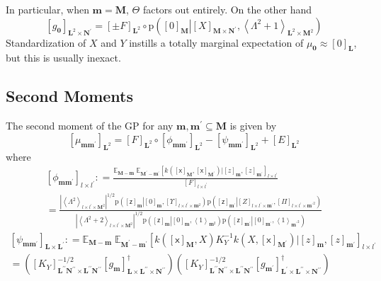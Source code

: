 \documentclass[preprint,12pt]{elsarticle}
\newcommand*{\M}[1]{\ensuremath{#1}\xspace}
\newcommand*{\x}{\times}
\newcommand*{\mi}[1]{\mathbf{#1}}
\newcommand*{\rv}[1]{\mathsf{#1}}
\newcommand*{\te}[2][]{\left\lbrack{#2}\right\rbrack_{#1}}
\newcommand*{\diag}[2][]{\left\langle{#2}\right\rangle_{#1}}
\newcommand*{\prob}[3]{\M{\mathrm{p}\!\left(\left.{#1}\right\vert{#2,#3}\right)}}
\newcommand*{\deq}{\M{\mathrel{\mathop:}=}}
\newcommand*{\evt}[3][]{\mathbb{E}_{#3}^{#1}\!#2}
\newcommand*{\modulus}[1]{\M{\left\lvert{#1}\right\rvert}}
\begin{document}
        In particular, when $\mi{m} = \mi{M}$, $\Theta$ factors out entirely. On the other hand
        \begin{equation*}
                \te[\mi{L}^{2}\x\mi{N^{\prime}}]{g_{\mi{0}}} =
                \te[\mi{L}^{2}]{\pm F} \circ 
                \prob{\te[\mi{M}]{0}}{\te[\mi{M}\x\mi{N^{\prime}}]{X}}
                {\diag[\mi{L}^{2}\x\mi{M}^{2}]{\Lambda^{2}+1}}                  
        \end{equation*}
        Standardization of $X$ and $Y$ instills a totally marginal expectation of $\mu_{\mi{0}} \approx \te[\mi{L}]{0}$, but this is usually inexact.

        \subsection{Second Moments} \label{sub:GPMom:Second}
        The second moment of the GP for any $\mi{m,m^{\prime}}\subseteq\mi{M}$ is given by
            \begin{equation} \label{eq:GPMom:Second}
                \te[\mi{L}^2]{\mu_{\mi{mm^{\prime}}}} = 
                \te[\mi{L}^2]{F} \circ \te[\mi{L}^2]{\phi_{\mi{mm^{\prime}}}} - \te[\mi{L}^2]{\psi_{\mi{mm^{\prime}}}} + \te[\mi{L}^2]{E}                        
            \end{equation}
            where
            \begin{multline*}
                \te[l\x l^{\prime}]{\phi_{\mi{mm^{\prime}}}}
                \deq \frac{\evt{\;\evt{\te[l\x l^{\prime}]{k\!\left(\te[\mi{M}]{\rv{x}},\te[\mi{M^{\prime}}]{\rv{x}}\right) \big\vert \te[\mi{m}]{z},\te[\mi{m^{\prime}}]{z}}}{\mi{M^{\prime}-m^{\prime}}}}{\mi{M-m}}}{\te[l\x l^{\prime}]{F}} \\
                = \frac
                {\modulus{\diag[l\x l^{\prime}\x\mi{M}^{2}]{\Lambda^{2}}}^{1/2} \prob{\te[\mi{m}]{\rv{z}}}{\te[\mi{m}]{0}}{\te[l\x l^{\prime}\x\mi{m}^2]{\Upsilon}}\prob{\te[\mi{m^{\prime}}]{\rv{z}}}{\te[l\x l^{\prime}\x \mi{m^{\prime}}]{Z}}{\te[l\x l^{\prime}\x\mi{m^{\prime}}^{2}]{\Pi}}}
                {\modulus{\diag[l\x l^{\prime}\x\mi{M}^2]{\Lambda^{2}+2}}^{1/2}
                \prob{\te[\mi{m}]{\rv{z}}}{\te[\mi{m}]{0}}{\diag[\mi{m}^{2}]{1}}\prob{\te[\mi{m^{\prime}}]{\rv{z}}}{\te[\mi{m^{\prime}}]{0}}{\diag[\mi{m^{\prime}}^{2}]{1}}}
            \end{multline*}
            \begin{multline*}
                \te[\mi{L\x L^{\prime}}]{\psi_{\mi{mm^{\prime}}}}
                \deq \evt{\;\evt{\te[l\x l^{\prime}]{k\!\left(\te[\mi{M}]{\rv{x}},X\right) K_{Y}^{-1} k\!\left(X,\te[\mi{M^{\prime}}]{\rv{x}}\right) \big\vert \te[\mi{m}]{z},\te[\mi{m^{\prime}}]{z}}}{\mi{M^{\prime}-m^{\prime}}}}{\mi{M-m}} \\
                 = \left(\te[\mi{L^{\prime\prime}N^{\prime\prime}}\x\mi{L^{\prime\prime}N^{\prime\prime}}]{K_{Y}}^{-1/2}
                 \te[\mi{L\x L^{\prime\prime}\x N^{\prime\prime}}]{g_{\mi{m}}}^{\dagger}\right)
                \left(\te[\mi{L^{\prime\prime}N^{\prime\prime}}\x\mi{L^{\prime\prime}N^{\prime\prime}}]{K_{Y}}^{-1/2} 
                \te[\mi{L^{\prime}\x L^{\prime\prime}\x N^{\prime\prime}}]{g_{\mi{m^{\prime}}}}^{\dagger}\right)
            \end{multline*}
\end{document}
